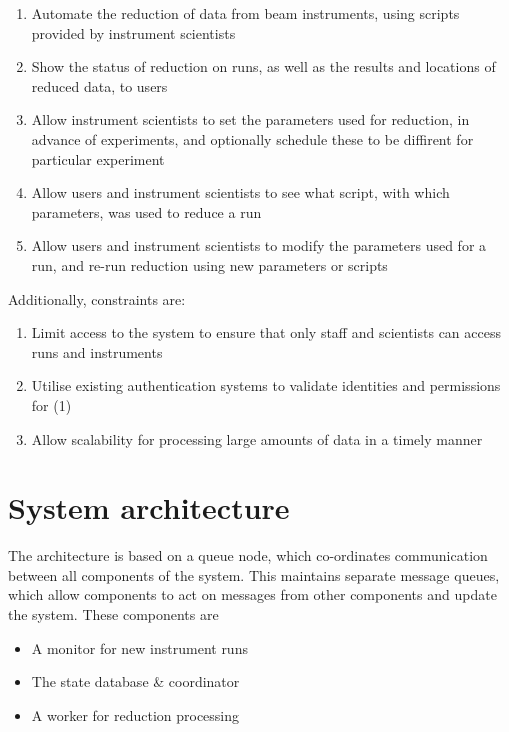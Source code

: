 \documentclass[twocolumn]{article}
\begin{document}
\begin{enumerate}[noitemsep]
\item
  Automate the reduction of data from beam instruments, using scripts
  provided by instrument scientists
\item
  Show the status of reduction on runs, as well as the results and
  locations of reduced data, to users
\item
  Allow instrument scientists to set the parameters used for reduction,
  in advance of experiments, and optionally schedule these to be diffirent
  for particular experiment
\item
  Allow users and instrument scientists to see what script, with which
  parameters, was used to reduce a run
\item
  Allow users and instrument scientists to modify the parameters used
  for a run, and re-run reduction using new parameters or scripts
\end{enumerate}

Additionally, constraints are:

\begin{enumerate}[noitemsep]
\item
  Limit access to the system to ensure that only staff and scientists
  can access runs and instruments
\item
  Utilise existing authentication systems to validate identities and
  permissions for (1)
\item
  Allow scalability for processing large amounts of data in a timely
  manner
\end{enumerate}

\section{System architecture}\label{system-architecture}

The architecture is based on a queue node, which co-ordinates
communication between all components of the system. This maintains
separate message queues, which allow components to act on messages from
other components and update the system. These components are

\begin{itemize}[noitemsep]
\item
  A monitor for new instrument runs
\item
  The state database \& coordinator
\item
  A worker for reduction processing
\end{itemize}
\end{document}
